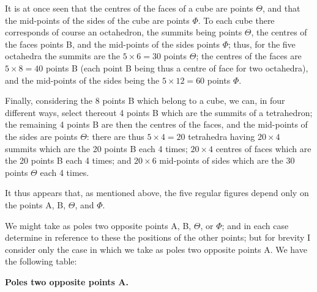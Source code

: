 \documentclass[11pt,a4paper]{book}
\begin{document}
It is at once seen that the centres of the faces of a cube are points $\Theta$, and that the mid-points of the sides of the cube are points $\Phi$. To each cube there corresponds of course an octahedron, the summits being points $\Theta$, the centres of the faces points B, and the mid-points of the sides points $\Phi$; thus, for the five octahedra the summits are the $5 \times 6 = 30$ points $\Theta$; the centres of the faces are $5 \times 8 = 40$ points B (each point B being thus a centre of face for two octahedra), and the mid-points of the sides being the $5 \times 12 = 60$ points $\Phi$.

Finally, considering the 8 points B which belong to a cube, we can, in four different ways, select thereout 4 points B which are the summits of a tetrahedron; the remaining 4 points B are then the centres of the faces, and the mid-points of the sides are points $\Theta$: there are thus $5 \times 4 = 20$ tetrahedra having $20 \times 4$ summits which are the 20 points B each 4 times; $20 \times 4$ centres of faces which are the 20 points B each 4 times; and $20 \times 6$ mid-points of sides which are the 30 points $\Theta$ each 4 times.

It thus appears that, as mentioned above, the five regular figures depend only on the points A, B, $\Theta$, and $\Phi$.

We might take as poles two opposite points A, B, $\Theta$, or $\Phi$; and in each case determine in reference to these the positions of the other points; but for brevity I consider only the case in which we take as poles two opposite points A. We have the following table:

\begin{center}
\textbf{Poles two opposite points A.}
\end{center}
\end{document}
